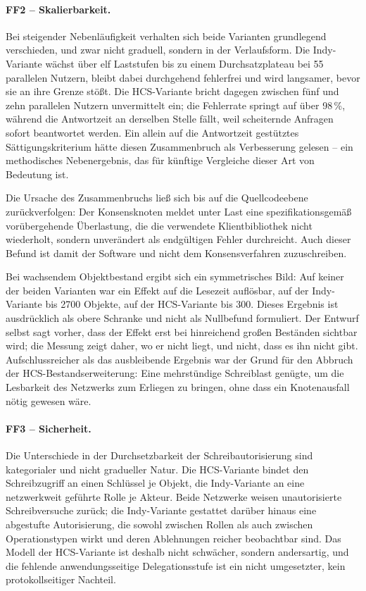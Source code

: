 \paragraph{FF2 -- Skalierbarkeit.} Bei steigender Nebenläufigkeit verhalten sich beide Varianten grundlegend verschieden, und zwar nicht graduell, sondern in der Verlaufsform. Die Indy-Variante wächst über elf Laststufen bis zu einem Durchsatzplateau bei 55 parallelen Nutzern, bleibt dabei durchgehend fehlerfrei und wird langsamer, bevor sie an ihre Grenze stößt. Die HCS-Variante bricht dagegen zwischen fünf und zehn parallelen Nutzern unvermittelt ein; die Fehlerrate springt auf über 98\,\%, während die Antwortzeit an derselben Stelle fällt, weil scheiternde Anfragen sofort beantwortet werden. Ein allein auf die Antwortzeit gestütztes Sättigungskriterium hätte diesen Zusammenbruch als Verbesserung gelesen -- ein methodisches Nebenergebnis, das für künftige Vergleiche dieser Art von Bedeutung ist.

Die Ursache des Zusammenbruchs ließ sich bis auf die Quellcodeebene zurückverfolgen: Der Konsensknoten meldet unter Last eine spezifikationsgemäß vorübergehende Überlastung, die die verwendete Klientbibliothek nicht wiederholt, sondern unverändert als endgültigen Fehler durchreicht. Auch dieser Befund ist damit der Software und nicht dem Konsensverfahren zuzuschreiben.

Bei wachsendem Objektbestand ergibt sich ein symmetrisches Bild: Auf keiner der beiden Varianten war ein Effekt auf die Lesezeit auflösbar, auf der Indy-Variante bis 2700 Objekte, auf der HCS-Variante bis 300. Dieses Ergebnis ist ausdrücklich als obere Schranke und nicht als Nullbefund formuliert. Der Entwurf selbst sagt vorher, dass der Effekt erst bei hinreichend großen Beständen sichtbar wird; die Messung zeigt daher, wo er nicht liegt, und nicht, dass es ihn nicht gibt. Aufschlussreicher als das ausbleibende Ergebnis war der Grund für den Abbruch der HCS-Bestandserweiterung: Eine mehrstündige Schreiblast genügte, um die Lesbarkeit des Netzwerks zum Erliegen zu bringen, ohne dass ein Knotenausfall nötig gewesen wäre.

\paragraph{FF3 -- Sicherheit.} Die Unterschiede in der Durchsetzbarkeit der Schreibautorisierung sind kategorialer und nicht gradueller Natur. Die HCS-Variante bindet den Schreibzugriff an einen Schlüssel je Objekt, die Indy-Variante an eine netzwerkweit geführte Rolle je Akteur. Beide Netzwerke weisen unautorisierte Schreibversuche zurück; die Indy-Variante gestattet darüber hinaus eine abgestufte Autorisierung, die sowohl zwischen Rollen als auch zwischen Operationstypen wirkt und deren Ablehnungen reicher beobachtbar sind. Das Modell der HCS-Variante ist deshalb nicht schwächer, sondern andersartig, und die fehlende anwendungsseitige Delegationsstufe ist ein nicht umgesetzter, kein protokollseitiger Nachteil.

